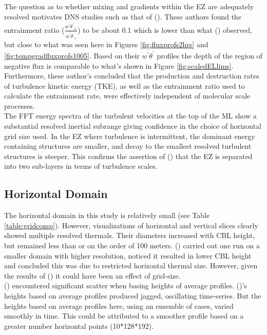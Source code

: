 The question as to whether mixing and gradients within the \acs{EZ} are adequately resolved motivates \acs{DNS}  studies such as that of \citeauthor{GarciaMellado} (\citeyear{GarciaMellado}). These authors found the entrainment ratio ($\frac{\overline{w^{'}\theta^{'}}_{z_{f}}}{\overline{w^{'}\theta^{'}}_{s}}$) to be about 0.1 which is lower than what \citeauthor{FedConzMir04} (\citeyear{FedConzMir04}) observed, but close to what was seen here in Figures \ref{fig:fluxprofs2hrs} and \ref{fig:tempgradfluxprofs1005}.  Based on their $\overline{w^{'}\theta^{'}}$ profiles the depth of the region of negative flux is comparable to what's shown in Figure \ref{fig:scaledELlims}.  Furthermore, these author's concluded that the production and destruction rates of turbulence kinetic energy (\acs{TKE}), as well as the entrainment ratio used to calculate the entrainment rate, were effectively independent of molecular scale processes.\\  
  
The \acs{FFT} energy spectra of the turbulent velocities at the top of the \acs{ML} show a substantial resolved inertial subrange giving confidence in the choice of horizontal grid size used. In the \acs{EZ} where turbulence is intermittent, the dominant energy containing structures are smaller, and decay to the smallest resolved turbulent structures is steeper. This confirms the assertion of \citeauthor{GarciaMellado} (\citeyear{GarciaMellado}) that the \acs{EZ} is separated into two sub-layers in terms of turbulence scales.\\

\subsection{Horizontal Domain}

The horizontal domain in this study is relatively small (see Table \ref{table:gridcomp}). However, visualizations of horizontal and vertical slices clearly showed multiple resolved thermals.  Their diameters increased with \acs{CBL} height, but remained less than or on the order of 100 meters.  \citeauthor{SullMoengStev} (\citeyear{SullMoengStev}) carried out one run on a smaller domain with higher resolution, noticed it resulted in lower \acs{CBL} height and concluded this was due to restricted horizontal thermal size. However, given the results of \citeauthor{SullPat} (\citeyear{SullPat}) it could have been an effect of grid-size.\\   

\citeauthor{BrooksFowler2} (\citeyear{BrooksFowler2}) encountered significant scatter when basing heights of average profiles.  \citeauthor{SullMoengStev} (\citeyear{SullMoengStev})'s heights based on average profiles produced jagged, oscillating time-series. But the heights based on average profiles here, using an ensemble of cases, varied smoothly in time.  This could be attributed to a smoother profile based on a greater number horizontal points (10*128*192).\\


